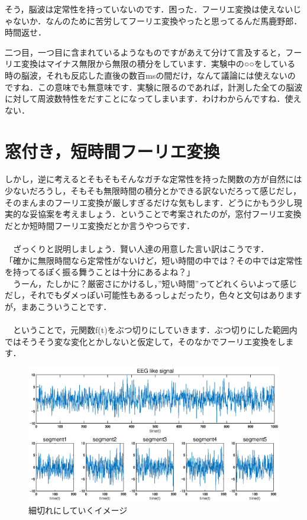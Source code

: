 \documentclass[11pt,a4paper]{ujreport} 	%
\begin{document}
そう，脳波は定常性を持っていないのです．困った．フーリエ変換は使えないじゃないか．なんのために苦労してフーリエ変換やったと思ってるんだ馬鹿野郎．時間返せ．

二つ目，一つ目に含まれているようなものですがあえて分けて言及すると，フーリエ変換はマイナス無限から無限の積分をしています．実験中の○○をしている時の脳波，それも反応した直後の数百msの間だけ，なんて議論には使えないのですね．この意味でも無意味です．実験に限るのであれば，計測した全ての脳波に対して周波数特性をだすことになってしまいます．わけわからんですね．使えない．

\section{窓付き，短時間フーリエ変換}
しかし，逆に考えるとそもそもそんなガチな定常性を持った関数の方が自然には少ないだろうし，そもそも無限時間の積分とかできる訳ないだろって感じだし，そのまんまのフーリエ変換が厳しすぎるだけな気もします．どうにかもう少し現実的な妥協案を考えましょう．ということで考案されたのが，窓付フーリエ変換だとか短時間フーリエ変換だとか言うやつらです．\\
\\
　ざっくりと説明しましょう．賢い人達の用意した言い訳はこうです．\\
「確かに無限時間なら定常性がないけど，短い時間の中では？その中では定常性を持ってるぽく振る舞うことは十分にあるよね？」\\
　うーん，たしかに？厳密さにかけるし，”短い時間”ってどれくらいよって感じだし，それでもダメっぽい可能性もあるっしょだったり，色々と文句はありますが，まあこういうことです．\\
\\
　ということで，元関数f(t)をぶつ切りにしていきます．ぶつ切りにした範囲内ではそうそう変な変化とかしないと仮定して，そのなかでフーリエ変換をします．\\

\begin{figure}[H]
  \label{im:dft1}
  \centering
  \includegraphics[width=15cm]{../figures/dft1.eps}
  \caption{細切れにしていくイメージ}
\end{figure}
\end{document}
